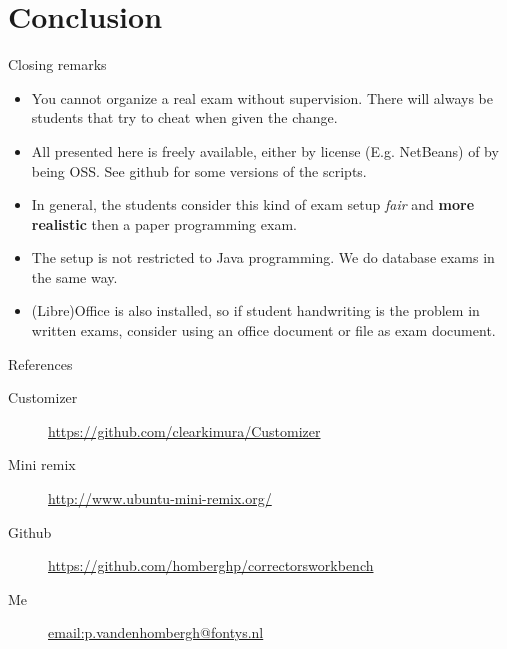 \section{Conclusion}
\begin{frame}{Closing remarks}
  \begin{itemize}
  \item You cannot organize a real exam without supervision. There
    will always be students that try to cheat when given the change.
  \item All presented here is freely available, either by license
    (E.g. NetBeans) of by being OSS. See github for some versions of
    the scripts.
  \item In general, the students consider this kind of exam setup \textit{fair}
    and \textbf{more realistic} then a paper programming exam.
  \item The setup is not restricted to Java programming. We do
    database exams in the same way.
  \item (Libre)Office is also installed, so if student handwriting is
    the problem in written exams, consider using an office document or
     file as exam document.
  \end{itemize}
\end{frame}
\begin{frame}{References}

  \begin{description}
  \item[Customizer] \url{https://github.com/clearkimura/Customizer}
    \item[Mini remix] \url{http://www.ubuntu-mini-remix.org/}
    \item[Github]
      \url{https://github.com/homberghp/correctorsworkbench}
    \item[Me] \url{email:p.vandenhombergh@fontys.nl}
  \end{description}
\end{frame}

